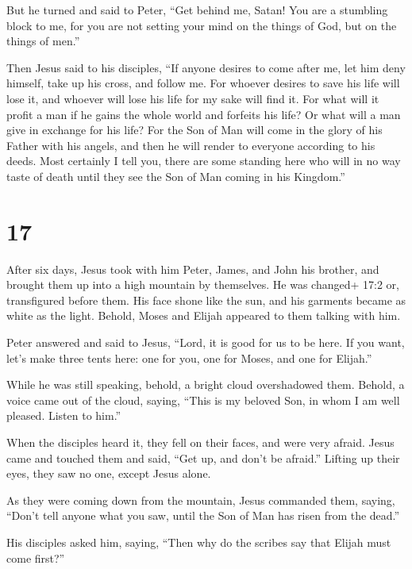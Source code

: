  But he turned and said to Peter, ``Get behind me, Satan!
You are a stumbling block to me, for you are not setting your mind on
the things of God, but on the things of men.''

 Then Jesus said to his disciples, ``If anyone desires to
come after me, let him deny himself, take up his cross, and follow me.
 For whoever desires to save his life will lose it, and
whoever will lose his life for my sake will find it.  For
what will it profit a man if he gains the whole world and forfeits his
life? Or what will a man give in exchange for his life? 
For the Son of Man will come in the glory of his Father with his angels,
and then he will render to everyone according to his deeds.
 Most certainly I tell you, there are some standing here
who will in no way taste of death until they see the Son of Man coming
in his Kingdom.''

\hypertarget{section-16}{%
\section{17}\label{section-16}}

 After six days, Jesus took with him Peter, James, and John
his brother, and brought them up into a high mountain by themselves.
 He was changed+ 17:2 or, transfigured before them. His face
shone like the sun, and his garments became as white as the light.
 Behold, Moses and Elijah appeared to them talking with him.

 Peter answered and said to Jesus, ``Lord, it is good for us
to be here. If you want, let's make three tents here: one for you, one
for Moses, and one for Elijah.''

 While he was still speaking, behold, a bright cloud
overshadowed them. Behold, a voice came out of the cloud, saying, ``This
is my beloved Son, in whom I am well pleased. Listen to him.''

 When the disciples heard it, they fell on their faces, and
were very afraid.  Jesus came and touched them and said,
``Get up, and don't be afraid.''  Lifting up their eyes,
they saw no one, except Jesus alone.

 As they were coming down from the mountain, Jesus commanded
them, saying, ``Don't tell anyone what you saw, until the Son of Man has
risen from the dead.''

 His disciples asked him, saying, ``Then why do the scribes
say that Elijah must come first?''

